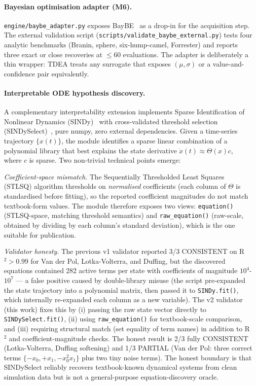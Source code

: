 \documentclass[review,3p]{elsarticle}
\begin{document}
\paragraph{Bayesian optimisation adapter (M6).} \texttt{engine/baybe\_adapter.py} exposes BayBE~\cite{sehnal2021baybe} as a drop-in for the acquisition step. The external validation script (\texttt{scripts/validate\_baybe\_external.py}) tests four analytic benchmarks (Branin, sphere, six-hump-camel, Forrester) and reports three exact or close recoveries at $\le 60$ evaluations. The adapter is deliberately a thin wrapper: TDEA treats any surrogate that exposes $(\mu, \sigma)$ or a value-and-confidence pair equivalently.

\paragraph{Interpretable ODE hypothesis discovery.} A complementary interpretability extension implements Sparse Identification of Nonlinear Dynamics (SINDy)~\cite{brunton2016sindy} with cross-validated threshold selection (SINDySelect)~\cite{branesgarza2021sindysellect}, pure numpy, zero external dependencies. Given a time-series trajectory $\{x(t)\}$, the module identifies a sparse linear combination of a polynomial library that best explains the state derivative $\dot x(t) \approx \Theta(x) c$, where $c$ is sparse. Two non-trivial technical points emerge:

\emph{Coefficient-space mismatch.} The Sequentially Thresholded Least Squares (STLSQ) algorithm thresholds on \emph{normalised} coefficients (each column of $\Theta$ is standardised before fitting), so the reported coefficient magnitudes do not match textbook-form values. The module therefore exposes two views: \texttt{equation()} (STLSQ-space, matching threshold semantics) and \texttt{raw\_equation()} (raw-scale, obtained by dividing by each column's standard deviation), which is the one suitable for publication.

\emph{Validator honesty.} The previous v1 validator reported 3/3 CONSISTENT on R$^2 > 0.99$ for Van der Pol, Lotka-Volterra, and Duffing, but the discovered equations contained 282 active terms per state with coefficients of magnitude $10^4$-$10^7$ --- a false positive caused by double-library misuse (the script pre-expanded the state trajectory into a polynomial matrix, then passed it to \texttt{SINDy.fit()}, which internally re-expanded each column as a new variable). The v2 validator (this work) fixes this by (i) passing the raw state vector directly to \texttt{SINDySelect.fit()}, (ii) using \texttt{raw\_equation()} for textbook-scale comparison, and (iii) requiring structural match (set equality of term names) in addition to R$^2$ and coefficient-magnitude checks. The honest result is 2/3 fully CONSISTENT (Lotka-Volterra, Duffing softening) and 1/3 PARTIAL (Van der Pol: three correct terms $\{-x_0, +x_1, -x_0^2 x_1\}$ plus two tiny noise terms). The honest boundary is that SINDySelect reliably recovers textbook-known dynamical systems from clean simulation data but is not a general-purpose equation-discovery oracle.
\end{document}

